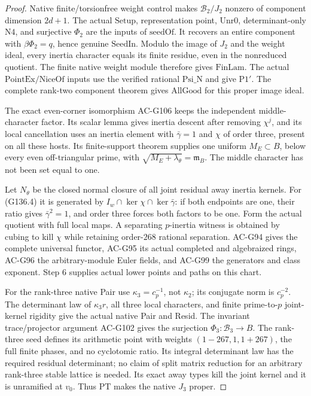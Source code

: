 \begin{proof}
Native finite/torsionfree weight control makes
\(\mathcal B_2/J_2\) nonzero of component dimension
\(2d+1\).  The actual \(\mathrm{Setup}\), representation
point, \(\mathrm{Unr0}\), determinant-only \(\mathrm{N4}\),
and surjective \(\Phi_2\) are the inputs of
\(\mathrm{seedOf}\).  It recovers an entire component
with \(\beta\Phi_2=q\), hence genuine \(\mathrm{SeedIn}\).
Modulo the image of \(J_2\) and the weight ideal, every
inertia character equals its finite residue, even in the
nonreduced quotient.  The finite native weight module
therefore gives \(\mathrm{FinLam}\).
The actual \(\mathrm{PointEx}/\mathrm{NiceOf}\) inputs
use the verified rational \(\mathrm{Psi\_N}\) and give
\(\mathrm{P1'}\).  The complete rank-two component theorem
gives \(\mathrm{AllGood}\) for this proper image ideal.

The exact even-corner isomorphism AC-G106 keeps the
independent middle-character factor.  Its scalar lemma
gives inertia descent after removing \(\chi^j\), and
its local cancellation uses an inertia element with
\(\bar\gamma=1\) and \(\chi\) of order three, present on
all these hosts.  Its finite-support theorem supplies
one uniform \(M_E\subset B\), below every even
off-triangular prime, with
\(\sqrt{M_E+\lambda_\theta}=\mathfrak m_B\).
The middle character has not been set equal to one.

Let \(N_\theta\) be the closed normal closure of all joint
residual away inertia kernels.  For (G136.4) it is generated
by \(I_w\cap\ker\chi\cap\ker\bar\gamma\): if both endpoints
are one, their ratio gives \(\bar\gamma^2=1\), and order three
forces both factors to be one.  Form the actual quotient
with full local maps.  A separating \(p\)-inertia witness
is obtained by cubing to kill \(\chi\) while retaining
order-\(268\) rational separation.
AC-G94 gives the complete universal functor, AC-G95 its
actual completed and algebraized rings, AC-G96 the
arbitrary-module Euler fields, and AC-G99 the generators
and class exponent.  Step 6 supplies actual lower points
and paths on this chart.

For the rank-three native Pair use \(\kappa_3=c_p^{-1}\),
not \(\kappa_2\); its conjugate norm is \(c_p^{-2}\).
The determinant law of \(\kappa_3r\), all three local
characters, and finite prime-to-\(p\) joint-kernel rigidity
give the actual native Pair and Resid.  The invariant
trace/projector argument AC-G102 gives the surjection
\(\Phi_3:\mathcal B_3\to B\).
The rank-three seed defines its arithmetic point with
weights \((1-267,1,1+267)\), the full finite phases, and
no cyclotomic ratio.  Its integral determinant law has
the required residual determinant; no claim of split
matrix reduction for an arbitrary rank-three stable
lattice is needed.  Its exact away types kill the
joint kernel and it is unramified at \(v_0\).
Thus \(\mathrm{PT}\) makes the native \(J_3\) proper.


\end{proof}

